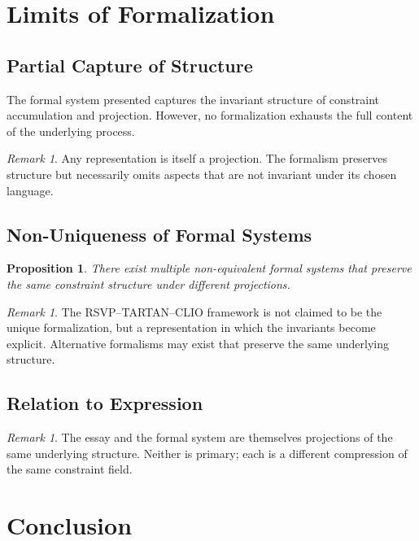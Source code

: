 \documentclass[11pt]{article}
\theoremstyle{plain}
\newtheorem{proposition}[theorem]{Proposition}
\theoremstyle{definition}
\theoremstyle{remark}
\newtheorem{remark}[theorem]{Remark}
\begin{document}
\section{Limits of Formalization}

\subsection{Partial Capture of Structure}

The formal system presented captures the invariant structure of
constraint accumulation and projection. However, no formalization
exhausts the full content of the underlying process.

\begin{remark}
Any representation is itself a projection. The formalism preserves
structure but necessarily omits aspects that are not invariant under
its chosen language.
\end{remark}

\subsection{Non-Uniqueness of Formal Systems}

\begin{proposition}
There exist multiple non-equivalent formal systems that preserve the
same constraint structure under different projections.
\end{proposition}

\begin{remark}
The RSVP--TARTAN--CLIO framework is not claimed to be the unique
formalization, but a representation in which the invariants become
explicit. Alternative formalisms may exist that preserve the same
underlying structure.
\end{remark}

\subsection{Relation to Expression}

\begin{remark}
The essay and the formal system are themselves projections of the same
underlying structure. Neither is primary; each is a different compression
of the same constraint field.
\end{remark}

\section{Conclusion}
\end{document}
